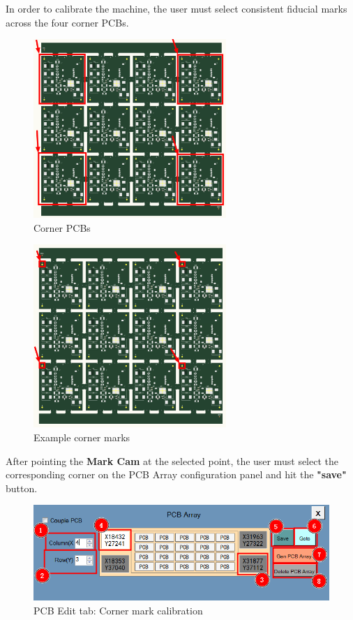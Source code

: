 \documentclass[a4paper,10pt]{report}
\begin{document}
In order to calibrate the machine, the user must select consistent fiducial marks across the four corner PCBs.
\newpage
\begin{figure}[!htb]
 \centering
 \includegraphics[width=0.65\textwidth]{panel_mini_a4_corners.png}
 \caption{Corner PCBs}
\end{figure}
\begin{figure}[!htb]
 \centering
 \includegraphics[width=0.65\textwidth]{panel_mini_a4_marks.png}
 \caption{Example corner marks}
\end{figure}
\newpage
After pointing the \textbf{Mark Cam} at the selected point, the user must select the corresponding corner on the PCB Array configuration panel and hit the \textbf{"save"} button.
\begin{figure}[!htb]
 \centering
 \includegraphics[width=1\textwidth]{scrot11.png}
 \caption{PCB Edit tab: Corner mark calibration}
\end{figure}
\end{document}
